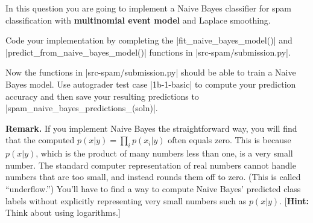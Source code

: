 \item {}
In this question you are going to implement a Naive Bayes classifier for spam
classification with {\bf multinomial event model} and Laplace smoothing.

Code your implementation by completing the |fit_naive_bayes_model()|
and |predict_from_naive_bayes_model()| functions in
|src-spam/submission.py|.

Now the functions in |src-spam/submission.py| should be able to train a Naive Bayes model.  Use autograder test case |1b-1-basic| to
compute your prediction accuracy and then save your resulting predictions
to\\|spam_naive_bayes_predictions_(soln)|.


{\bf Remark.} If you implement Naive Bayes the straightforward way, you will find
that the computed $p(x\vert y) = \prod_i p(x_i \vert  y)$ often equals zero.  This is
because $p(x\vert y)$, which is the product of many numbers less than one, is a very
small  number. The standard computer representation of real numbers cannot
handle numbers that are too small, and instead rounds them off to zero.  (This
is called  ``underflow.'')  You'll have to find a way to compute Naive Bayes'
predicted  class labels without explicitly representing very small numbers such
as $p(x\vert y)$.
[\textbf{Hint:} Think about using logarithms.]
